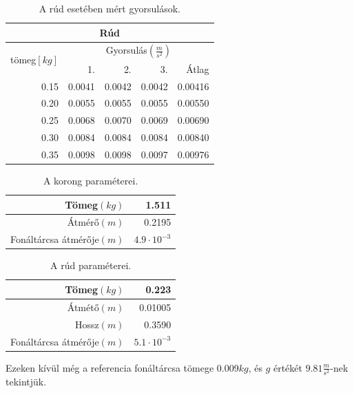 \documentclass[10pt,pdftex]{report}
\begin{document}
\begin{table}[H]
    \centering
    \begin{tabular}{|r|r|r|r|r|}
        \hline
        \multicolumn{5}{|c|}{Rúd}\\
        \hline
        \multirow[c]{2}{*}{tömeg$[kg]$} & \multicolumn{4}{|c|}{Gyorsulás$(\frac{m}{s^2})$} \\
        \cline{2-5}
        & 1. & 2. & 3. & Átlag \\
        \hline
        0.15 & 0.0041 & 0.0042 & 0.0042 & 0.00416 \\
        \hline
        0.20 & 0.0055 & 0.0055 & 0.0055 & 0.00550 \\
        \hline
        0.25 & 0.0068 & 0.0070 & 0.0069 & 0.00690 \\
        \hline
        0.30 & 0.0084 & 0.0084 & 0.0084 & 0.00840 \\
        \hline
        0.35 & 0.0098 & 0.0098 & 0.0097 & 0.00976 \\
        \hline
    \end{tabular}
    \caption{A rúd esetében mért gyorsulások.}
\end{table}
\begin{table}[H]
    \centering
    \begin{tabular}{|r|r|}
        \hline
        Tömeg$(kg)$ & 1.511 \\
        \hline
        Átmérő$(m)$ & 0.2195 \\
        \hline
        Fonáltárcsa átmérője$(m)$ & $4.9\cdot 10^{-3}$ \\
        \hline
    \end{tabular}
    \caption{A korong paraméterei.}
\end{table}
\begin{table}[H]
    \centering
    \begin{tabular}{|r|r|}
        \hline
        Tömeg$(kg)$ & 0.223 \\
        \hline
        Átmétő$(m)$ & 0.01005 \\
        \hline
        Hossz$(m)$ & 0.3590 \\
        \hline
        Fonáltárcsa átmérője$(m)$ & $5.1\cdot 10^{-3}$ \\
        \hline
    \end{tabular}
    \caption{A rúd paraméterei.}
\end{table}
Ezeken kívül még a referencia fonáltárcsa tömege 0.009$kg$, és $g$ értékét $9.81\frac{m}{s^2}$-nek tekintjük.
\end{document}
